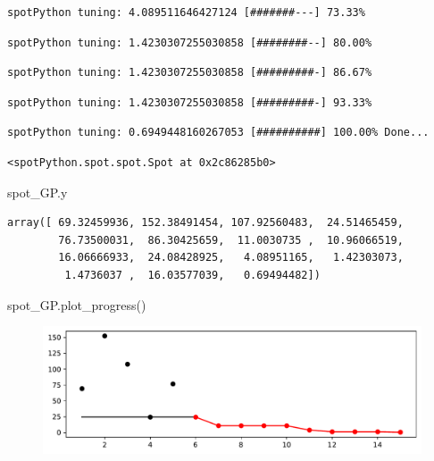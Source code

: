 \documentclass[
  letterpaper,
  DIV=11,
  numbers=noendperiod]{scrreprt}
\newenvironment{Shaded}{\begin{snugshade}}{\end{snugshade}}
\newcommand{\NormalTok}[1]{\textcolor[rgb]{0.00,0.23,0.31}{#1}}
\begin{document}
\begin{verbatim}
spotPython tuning: 4.089511646427124 [#######---] 73.33% 
\end{verbatim}

\begin{verbatim}
spotPython tuning: 1.4230307255030858 [########--] 80.00% 
\end{verbatim}

\begin{verbatim}
spotPython tuning: 1.4230307255030858 [#########-] 86.67% 
\end{verbatim}

\begin{verbatim}
spotPython tuning: 1.4230307255030858 [#########-] 93.33% 
\end{verbatim}

\begin{verbatim}
spotPython tuning: 0.6949448160267053 [##########] 100.00% Done...
\end{verbatim}

\begin{verbatim}
<spotPython.spot.spot.Spot at 0x2c86285b0>
\end{verbatim}

\begin{Shaded}
\begin{Highlighting}[]
\NormalTok{spot\_GP.y}
\end{Highlighting}
\end{Shaded}

\begin{verbatim}
array([ 69.32459936, 152.38491454, 107.92560483,  24.51465459,
        76.73500031,  86.30425659,  11.0030735 ,  10.96066519,
        16.06666933,  24.08428925,   4.08951165,   1.42303073,
         1.4736037 ,  16.03577039,   0.69494482])
\end{verbatim}

\begin{Shaded}
\begin{Highlighting}[]
\NormalTok{spot\_GP.plot\_progress()}
\end{Highlighting}
\end{Shaded}

\begin{figure}[H]

{\centering \includegraphics{07_spot_ei_files/figure-pdf/cell-35-output-1.pdf}

}

\end{figure}
\end{document}
